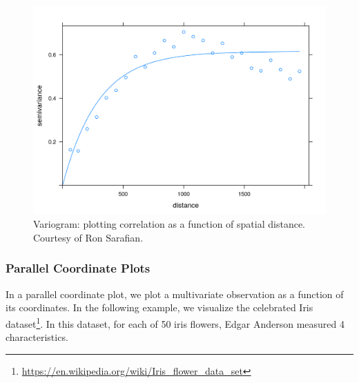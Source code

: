 \documentclass[]{book}
\newenvironment{Shaded}{\begin{snugshade}}{\end{snugshade}}
\newcommand{\DataTypeTok}[1]{\textcolor[rgb]{0.13,0.29,0.53}{#1}}
\newcommand{\DecValTok}[1]{\textcolor[rgb]{0.00,0.00,0.81}{#1}}
\newcommand{\KeywordTok}[1]{\textcolor[rgb]{0.13,0.29,0.53}{\textbf{#1}}}
\newcommand{\NormalTok}[1]{#1}
\newcommand{\OperatorTok}[1]{\textcolor[rgb]{0.81,0.36,0.00}{\textbf{#1}}}
\newcommand{\StringTok}[1]{\textcolor[rgb]{0.31,0.60,0.02}{#1}}
\renewcommand{\href}[2]{#2\footnote{\url{#1}}}
\theoremstyle{definition}
\theoremstyle{definition}
\theoremstyle{definition}
\theoremstyle{remark}
\begin{document}
\begin{figure}
\centering
\includegraphics{art/variogram.png}
\caption{Variogram: plotting correlation as a function of spatial distance. Courtesy of Ron Sarafian.}
\end{figure}

\hypertarget{parcoord}{%
\subsubsection{Parallel Coordinate Plots}\label{parcoord}}

In a parallel coordinate plot, we plot a multivariate observation as a function of its coordinates.
In the following example, we visualize the celebrated \href{https://en.wikipedia.org/wiki/Iris_flower_data_set}{Iris dataset}.
In this dataset, for each of 50 iris flowers, Edgar Anderson measured 4 characteristics.

\begin{Shaded}
\end{Shaded}
\end{document}
